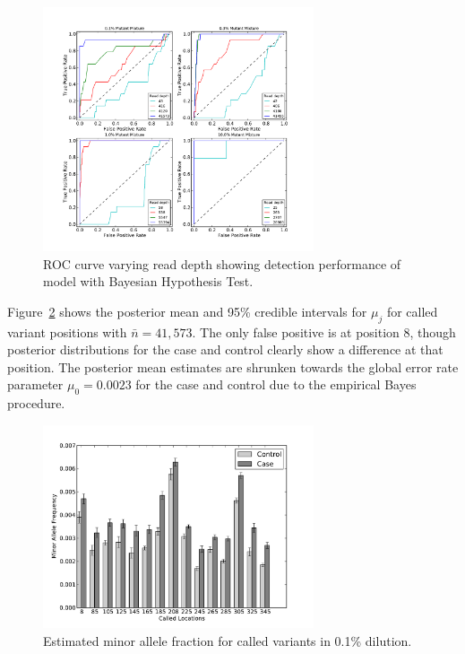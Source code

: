 \documentclass[11pt,reqno]{amsart}
\begin{document}
\begin{figure}[htbp]
\begin{center}
\includegraphics[width=80mm]{pdf_figs/ROC_without_chi2.pdf}
\caption{ROC curve varying read depth showing detection performance of model with Bayesian Hypothesis Test.}
\label{fig:ROC}
\end{center}
\end{figure}

Figure~\ref{fig:MAF} shows the posterior mean and 95\% credible intervals for $\mu_j$ for called variant positions with $\bar{n} = 41,573$. The only false positive is at position 8, though posterior distributions for the case and control clearly show a difference at that position. The posterior mean estimates are shrunken towards the global error rate parameter $\mu_0 = 0.0023$ for the case and control due to the empirical Bayes procedure.

\begin{figure}[h]
\begin{center}
\includegraphics[width=80mm]{pdf_figs/MuBarPlot.pdf}
\caption{Estimated minor allele fraction for called variants in 0.1\% dilution.}
\label{fig:MAF}
\end{center}
\end{figure}
\end{document}
